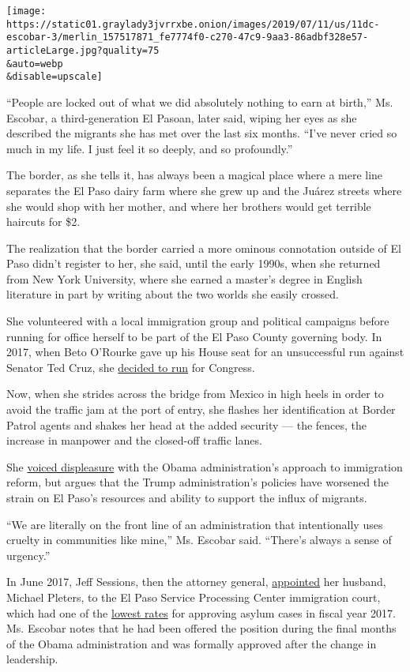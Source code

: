 \texttt{[image: https://static01.graylady3jvrrxbe.onion/images/2019/07/11/us/11dc-escobar-3/merlin\_157517871\_fe7774f0-c270-47c9-9aa3-86adbf328e57-articleLarge.jpg?quality=75\\\&auto=webp\\\&disable=upscale]}

``People are locked out of what we did absolutely nothing to earn at
birth,'' Ms. Escobar, a third-generation El Pasoan, later said, wiping
her eyes as she described the migrants she has met over the last six
months. ``I've never cried so much in my life. I just feel it so deeply,
and so profoundly.''

The border, as she tells it, has always been a magical place where a
mere line separates the El Paso dairy farm where she grew up and the
Juárez streets where she would shop with her mother, and where her
brothers would get terrible haircuts for \$2.

The realization that the border carried a more ominous connotation
outside of El Paso didn't register to her, she said, until the early
1990s, when she returned from New York University, where she earned a
master's degree in English literature in part by writing about the two
worlds she easily crossed.

She volunteered with a local immigration group and political campaigns
before running for office herself to be part of the El Paso County
governing body. In 2017, when Beto O'Rourke gave up his House seat for
an unsuccessful run against Senator Ted Cruz, she
\href{https://www.youtube.com/watch?v=vv8L7EeEAj8}{decided to run} for
Congress.

Now, when she strides across the bridge from Mexico in high heels in
order to avoid the traffic jam at the port of entry, she flashes her
identification at Border Patrol agents and shakes her head at the added
security --- the fences, the increase in manpower and the closed-off
traffic lanes.

She
\href{https://www.nytimes3xbfgragh.onion/2013/02/11/opinion/gridlock-on-the-rio-grande.html?searchResultPosition=24}{voiced
displeasure} with the Obama administration's approach to immigration
reform, but argues that the Trump administration's policies have
worsened the strain on El Paso's resources and ability to support the
influx of migrants.

``We are literally on the front line of an administration that
intentionally uses cruelty in communities like mine,'' Ms. Escobar said.
``There's always a sense of urgency.''

In June 2017, Jeff Sessions, then the attorney general,
\href{https://www.justice.gov/eoir/pr/executive-office-immigration-review-swears-11-immigration-judges}{appointed}
her husband, Michael Pleters, to the El Paso Service Processing Center
immigration court, which had one of the
\href{https://www.justice.gov/eoir/page/file/1107056/download}{lowest
rates} for approving asylum cases in fiscal year 2017. Ms. Escobar notes
that he had been offered the position during the final months of the
Obama administration and was formally approved after the change in
leadership.

